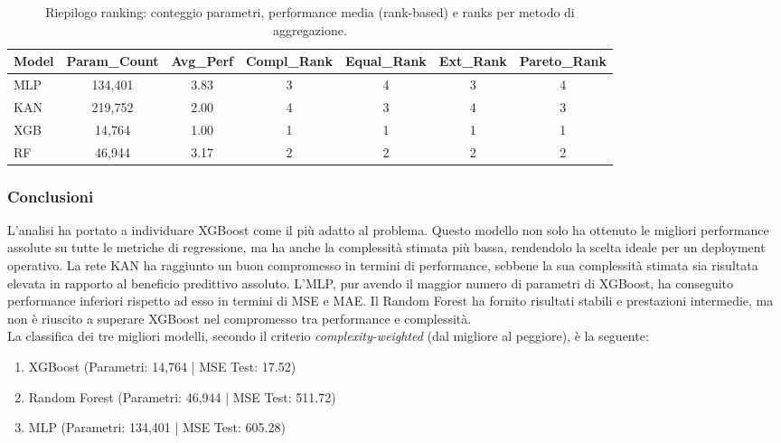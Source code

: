 \documentclass[a4paper,12pt]{report}
\begin{document}
	\begin{table}[H]
		\centering
		\setlength{\tabcolsep}{2pt}
		\small
		\begin{tabular}{lcccccc}
			\toprule
			\textbf{Model} & \textbf{Param\_Count} & \textbf{Avg\_Perf} & \textbf{Compl\_Rank} & \textbf{Equal\_Rank} & \textbf{Ext\_Rank} & \textbf{Pareto\_Rank} \\
			\midrule
			MLP           & 134,401 & 3.83 & 3 & 4 & 3 & 4 \\
			KAN           & 219,752 & 2.00 & 4 & 3 & 4 & 3 \\
			XGB 		  & 14,764  & 1.00 & 1 & 1 & 1 & 1 \\
			RF 			  & 46,944  & 3.17 & 2 & 2 & 2 & 2 \\
			\bottomrule
		\end{tabular}
		\caption{Riepilogo ranking: conteggio parametri, performance media (rank-based) e ranks per metodo di aggregazione.}
	\end{table}
	
	\subsubsection{Conclusioni}
	L'analisi ha portato a individuare XGBoost come il più adatto al problema. Questo modello non solo ha ottenuto le migliori performance assolute su tutte le metriche di regressione, ma ha anche la complessità stimata più bassa, rendendolo la scelta ideale per un deployment operativo. La rete KAN ha raggiunto un buon compromesso in termini di performance, sebbene la sua complessità stimata sia risultata elevata in rapporto al beneficio predittivo assoluto. L'MLP, pur avendo il maggior numero di parametri di XGBoost, ha conseguito performance inferiori rispetto ad esso in termini di MSE e MAE. Il Random Forest ha fornito risultati stabili e prestazioni intermedie, ma non è riuscito a superare XGBoost nel compromesso tra performance e complessità. \\
	La classifica dei tre migliori modelli, secondo il criterio \emph{complexity-weighted} (dal migliore al peggiore), è la seguente:
	\begin{enumerate}
		\item XGBoost (Parametri: 14,764 | MSE Test: 17.52)
		\item Random Forest (Parametri: 46,944 | MSE Test: 511.72)
		\item MLP (Parametri: 134,401 | MSE Test: 605.28)
	\end{enumerate}
	
\end{document}
